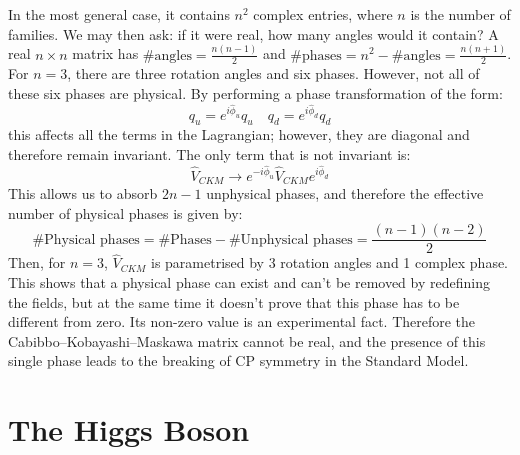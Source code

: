 \documentclass[11pt,a4paper,twoside,openright]{report}
\begin{document}
In the most general case, it contains \(n^2\) complex entries, where \(n\) is the number of families. We may then ask: if it were real, how many angles would it contain? A real \(n\times n\) matrix has \(\#\text{angles}=\frac{n(n-1)}{2}\) and \(\#\text{phases}=n^2-\#\text{angles}=\frac{n(n+1)}{2}\). For \(n=3\), there are three rotation angles and six phases. However, not all of these six phases are physical. By performing a phase transformation of the form:
\begin{equation}
q_u=e^{i\hat{\phi}_u}q_u \quad q_d=e^{i\hat{\phi}_d}q_d
\end{equation}
this affects all the terms in the Lagrangian; however, they are diagonal and therefore remain invariant. The only term that is not invariant is:
\begin{equation}
\hat{V}_{CKM}\longrightarrow e^{-i\hat{\phi}_u}\hat{V}_{CKM}e^{i\hat{\phi}_d}
\end{equation}
This allows us to absorb \(2n-1\) unphysical phases, and therefore the effective number of physical phases is given by:
\begin{equation}
\#\text{Physical phases}= \#\text{Phases} - \#\text{Unphysical phases}= \frac{(n-1)(n-2)}{2}
\end{equation}
Then, for \(n=3\), \(\hat{V}_{CKM}\) is parametrised by 3 rotation angles and 1 complex phase. 
This shows that a physical phase can exist and can't be removed by redefining the fields, but at the same time it doesn't prove that this phase has to be different from zero. Its non-zero value is an experimental fact.
Therefore the Cabibbo--Kobayashi--Maskawa matrix cannot be real, and the presence of this single phase leads to the breaking of CP symmetry in the Standard Model.

\section{The Higgs Boson}
\end{document}
